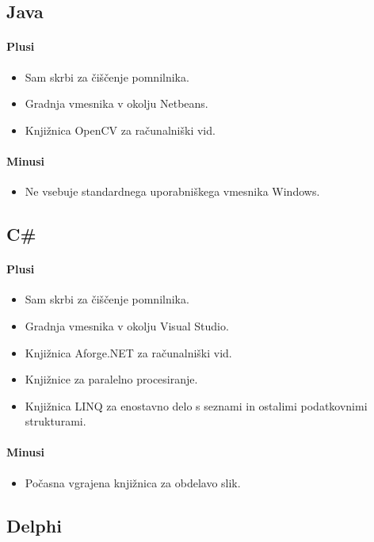 \documentclass[oneside, a4paper, 12pt]{book}
\begin{document}
\subsection{Java}
\paragraph{Plusi}
\begin{itemize}
\item Sam skrbi za čiščenje pomnilnika.
\item Gradnja vmesnika v okolju Netbeans.
\item Knjižnica OpenCV za računalniški vid.
\end{itemize}
\paragraph{Minusi}
\begin{itemize}
\item Ne vsebuje standardnega uporabniškega vmesnika Windows.
\end{itemize}

\subsection{C\#}
\paragraph{Plusi}
\begin{itemize}
\item Sam skrbi za čiščenje pomnilnika.
\item Gradnja vmesnika v okolju Visual Studio.
\item Knjižnica Aforge.NET za računalniški vid.
\item Knjižnice za paralelno procesiranje.
\item Knjižnica LINQ za enostavno delo s seznami in ostalimi podatkovnimi 
strukturami.
\end{itemize}
\paragraph{Minusi}
\begin{itemize}
\item Počasna vgrajena knjižnica za obdelavo slik.
\end{itemize}


\subsection{Delphi}
\end{document}
